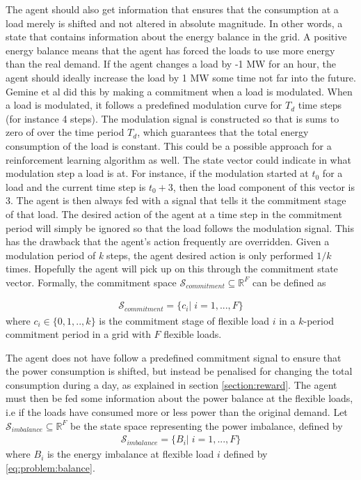 \documentclass[class=book, crop=false]{standalone}
\begin{document}
The agent should also get information that ensures that the consumption at a load merely is shifted and not altered in absolute magnitude. In other words, a state that contains information about the energy balance in the grid. A positive energy balance means that the agent has forced the loads to use more energy than the real demand. If the agent changes a load by -1 MW for an hour, the agent should ideally increase the load by 1 MW some time not far into the future. Gemine et al did this by making a commitment when a load is modulated. When a load is modulated, it follows a predefined modulation curve for $T_{d}$ time steps (for instance 4 steps)\cite{active_network_management}. The modulation signal is constructed so that is sums to zero of over the time period $T_{d}$, which guarantees that the total energy consumption of the load is constant. This could be a possible approach for a reinforcement learning algorithm as well. The state vector could indicate in what modulation step a load is at. For instance, if the modulation started at $t_{0}$ for a load and the current time step is $t_{0} + 3$, then the load component of this vector is 3. The agent is then always fed with a signal that tells it the commitment stage of that load. The desired action of the agent at a time step in the commitment period will simply be ignored so that the load follows the modulation signal. This has the drawback that the agent's action frequently are overridden. Given a modulation period of \textit{k} steps, the agent desired action is only performed $1/k$ times. Hopefully the agent will pick up on this through the commitment state vector. Formally, the commitment space $\mathcal{S}_{commitment} \subseteq \mathbb{R}^{F}$ can be defined as



\begin{equation}
   \begin{aligned}
   \label{eq:problem:commitment_state}
\mathcal{S}_{commitment} = \{ c_{i} | \;i = 1,...,F\}
    \end{aligned} 
\end{equation}
where $c_{i} \in \{0,1,..,k\}$ is the commitment stage of flexible load $i$ in a $k$-period commitment period in a grid with $F$ flexible loads.

The agent does not have follow a predefined commitment signal to ensure that the power consumption is shifted, but instead be penalised for changing the total consumption during a day, as explained in section \ref{section:reward}. The agent must then be fed some information about the power balance at the flexible loads, i.e if the loads have consumed more or less power than the original demand. Let  $\mathcal{S}_{imbalance} \subseteq \mathbb{R}^{F}$  be the state space representing the power imbalance, defined by \begin{equation}
   \begin{aligned}
   \label{eq:problem:imbalance_state}
\mathcal{S}_{imbalance} = \{ B_{i} |\; i = 1,...,F\}
    \end{aligned} 
\end{equation}
where $B_{i}$ is the energy imbalance at flexible load $i$ defined by \eqref{eq:problem:balance}.
\end{document}
